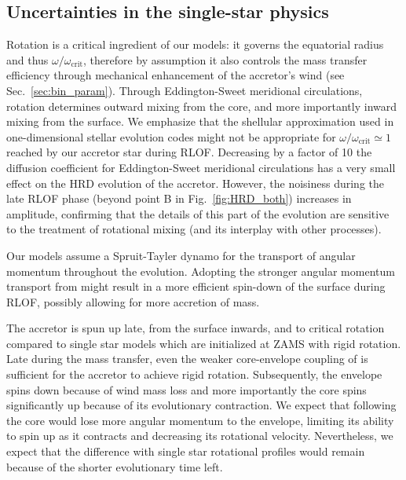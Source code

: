 \documentclass[twocolumn,twocolappendix,trackchanges]{aastex63}
\DeclareRobustCommand{\Figref}[1]{Fig.~\ref{#1}}
\DeclareRobustCommand{\Secref}[1]{Sec.~\ref{#1}}
\begin{document}
\subsection{Uncertainties in the single-star physics}
\label{sec:single_star_uncertainties}
Rotation is a critical ingredient of our models: it governs the
equatorial radius and thus $\omega/\omega_\mathrm{crit}$, therefore by
assumption it also controls the mass transfer efficiency through
mechanical enhancement of the accretor's wind (see
\Secref{sec:bin_param}). Through Eddington-Sweet meridional
circulations, rotation determines outward mixing from the core, and
more importantly inward mixing from the surface.  We emphasize that
the shellular approximation used in one-dimensional stellar evolution
codes might not be appropriate for
$\omega/\omega_\mathrm{crit}\simeq 1$ reached by our accretor star
during RLOF. Decreasing by a factor of 10 the diffusion coefficient
for Eddington-Sweet meridional circulations has a very small effect on
the HRD evolution of the accretor. However, the noisiness during the
late RLOF phase (beyond point B in \Figref{fig:HRD_both}) increases in
amplitude, confirming that the details of this part of the evolution
are sensitive to the treatment of rotational mixing (and its interplay
with other processes). %

Our models assume a Spruit-Tayler dynamo \citep{spruit:02} for the
transport of angular momentum throughout the evolution. Adopting the
stronger angular momentum transport from \cite{fuller:19} might result
in a more efficient spin-down of the surface during RLOF, possibly
allowing for more accretion of mass.

The accretor is spun up late, from the surface inwards, and to
critical rotation compared to single star models which are initialized
at ZAMS with rigid rotation. Late during the mass transfer, even the
weaker core-envelope coupling of \cite{spruit:02} is sufficient for
the accretor to achieve rigid rotation. Subsequently, the envelope
spins down because of wind mass loss and more importantly the core
spins significantly up because of its evolutionary contraction. We
expect that following \cite{fuller:19} the core would lose more
angular momentum to the envelope, limiting its ability to spin up as
it contracts and decreasing its rotational velocity.
Nevertheless, we expect that the difference with single star
rotational profiles would remain because of the shorter evolutionary time left.
\end{document}
